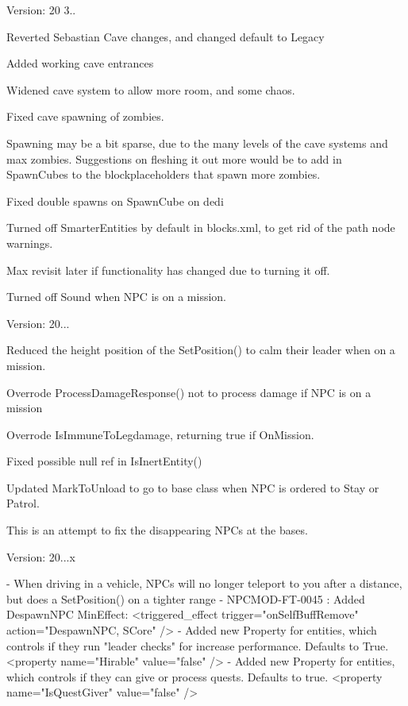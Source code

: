 Version\+: 20 3..
\begin{DoxyItemize}
\item Reverted Sebastian Cave changes, and changed default to Legacy
\item Added working cave entrances
\item Widened cave system to allow more room, and some chaos.
\item Fixed cave spawning of zombies.
\begin{DoxyItemize}
\item Spawning may be a bit sparse, due to the many levels of the cave systems and max zombies. Suggestions on fleshing it out more would be to add in Spawn\+Cubes to the blockplaceholders that spawn more zombies.
\end{DoxyItemize}
\item Fixed double spawns on Spawn\+Cube on dedi
\item Turned off Smarter\+Entities by default in blocks.\+xml, to get rid of the path node warnings.
\begin{DoxyItemize}
\item Max revisit later if functionality has changed due to turning it off.
\end{DoxyItemize}
\item Turned off Sound when NPC is on a mission.
\end{DoxyItemize}

Version\+: 20...
\begin{DoxyItemize}
\item Reduced the height position of the Set\+Position() to calm their leader when on a mission.
\item Overrode Process\+Damage\+Response() not to process damage if NPC is on a mission
\item Overrode Is\+Immune\+To\+Legdamage, returning true if On\+Mission.
\item Fixed possible null ref in Is\+Inert\+Entity()
\item Updated Mark\+To\+Unload to go to base class when NPC is ordered to Stay or Patrol.
\begin{DoxyItemize}
\item This is an attempt to fix the disappearing NPCs at the bases.
\end{DoxyItemize}
\end{DoxyItemize}

Version\+: 20...\+x \begin{DoxyVerb}- When driving in a vehicle, NPCs will no longer teleport to you after a distance, but does a SetPosition() on a tighter range
- NPCMOD-FT-0045 : Added DespawnNPC MinEffect: <triggered_effect trigger="onSelfBuffRemove" action="DespawnNPC, SCore" />
- Added new Property for entities, which controls if they run "leader checks" for increase performance. Defaults to True.
    <property name="Hirable" value="false" />
- Added new Property for entities, which controls if they can give or process quests. Defaults to true.
    <property name="IsQuestGiver" value="false" />
\end{DoxyVerb}


